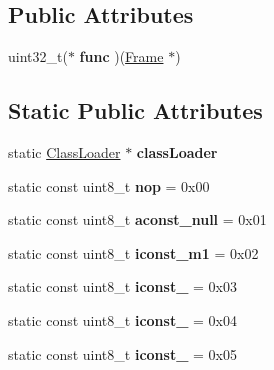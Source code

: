 \subsection*{Public Attributes}
\begin{DoxyCompactItemize}
\item 
uint32\+\_\+t($\ast$ {\bfseries func} )(\hyperlink{classFrame}{Frame} $\ast$)\hypertarget{classInstruction_a93523ebc2d5ac20edb9a3cc9e43e8820}{}\label{classInstruction_a93523ebc2d5ac20edb9a3cc9e43e8820}

\end{DoxyCompactItemize}
\subsection*{Static Public Attributes}
\begin{DoxyCompactItemize}
\item 
static \hyperlink{classClassLoader}{Class\+Loader} $\ast$ {\bfseries class\+Loader}\hypertarget{classInstruction_afab965d49bed6fa136e2b2c00bfc3825}{}\label{classInstruction_afab965d49bed6fa136e2b2c00bfc3825}

\item 
static const uint8\+\_\+t {\bfseries nop} = 0x00\hypertarget{classInstruction_a276c15c7d82cc78cf588c9ba3bfd5806}{}\label{classInstruction_a276c15c7d82cc78cf588c9ba3bfd5806}

\item 
static const uint8\+\_\+t {\bfseries aconst\+\_\+null} = 0x01\hypertarget{classInstruction_a7c0b16a1b4598c944037c4c9f5ed3433}{}\label{classInstruction_a7c0b16a1b4598c944037c4c9f5ed3433}

\item 
static const uint8\+\_\+t {\bfseries iconst\+\_\+m1} = 0x02\hypertarget{classInstruction_acbbe96d38b4446d2adc3fb5d28260c75}{}\label{classInstruction_acbbe96d38b4446d2adc3fb5d28260c75}

\item 
static const uint8\+\_\+t {\bfseries iconst\+\_} = 0x03\hypertarget{classInstruction_ab6f9753863cf496474fa3d4b14098947}{}\label{classInstruction_ab6f9753863cf496474fa3d4b14098947}

\item 
static const uint8\+\_\+t {\bfseries iconst\+\_} = 0x04\hypertarget{classInstruction_ae65542798e5fd351c529c141f69c72d3}{}\label{classInstruction_ae65542798e5fd351c529c141f69c72d3}

\item 
static const uint8\+\_\+t {\bfseries iconst\+\_} = 0x05\hypertarget{classInstruction_a5dfddd7e7a6c896ae8e2136e2c685bc8}{}\label{classInstruction_a5dfddd7e7a6c896ae8e2136e2c685bc8}


\end{DoxyCompactItemize}
